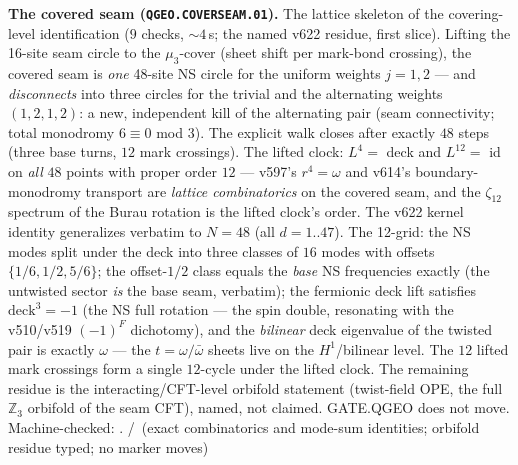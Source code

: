 \documentclass[11pt,a4paper]{article}
\theoremstyle{definition}
\begin{document}
\par\smallskip\noindent\textbf{The covered seam
(\texttt{QGEO.COVERSEAM.01}).}
The lattice skeleton of the covering-level identification ($9$
checks, ${\sim}4$\,s; the named v622 residue, first slice).
Lifting the 16-site seam circle to the $\mu_3$-cover (sheet shift
per mark-bond crossing), the covered seam is \emph{one} 48-site NS
circle for the uniform weights $j=1,2$ --- and \emph{disconnects}
into three circles for the trivial and the alternating weights
$(1,2,1,2)$: a new, independent kill of the alternating pair (seam
connectivity; total monodromy $6\equiv0$ mod $3$).  The explicit
walk closes after exactly $48$ steps (three base turns, $12$ mark
crossings).  The lifted clock: $L^4=$ deck and $L^{12}=$ id on
\emph{all} $48$ points with proper order $12$ --- v597's
$r^4=\omega$ and v614's boundary-monodromy transport are
\emph{lattice combinatorics} on the covered seam, and the
$\zeta_{12}$ spectrum of the Burau rotation is the lifted clock's
order.  The v622 kernel identity generalizes verbatim to $N=48$
(all $d=1..47$).  The 12-grid: the NS modes split under the deck
into three classes of $16$ modes with offsets $\{1/6,1/2,5/6\}$; the
offset-$1/2$ class equals the \emph{base} NS frequencies exactly
(the untwisted sector \emph{is} the base seam, verbatim); the
fermionic deck lift satisfies $\mathrm{deck}^3=-1$ (the NS full
rotation --- the spin double, resonating with the v510/v519
$(-1)^F$ dichotomy), and the \emph{bilinear} deck eigenvalue of the
twisted pair is exactly $\omega$ --- the $t=\omega/\bar\omega$
sheets live on the $H^1$/bilinear level.  The $12$ lifted mark
crossings form a single $12$-cycle under the lifted clock.  The
remaining residue is the interacting/CFT-level orbifold statement
(twist-field OPE, the full $\mathbb{Z}_3$ orbifold of the seam CFT),
named, not claimed.  GATE.QGEO does not move.
Machine-checked: .
\mE/\mC\ (exact combinatorics and mode-sum identities; orbifold
residue typed; no marker moves)
\par\smallskip
\end{document}
